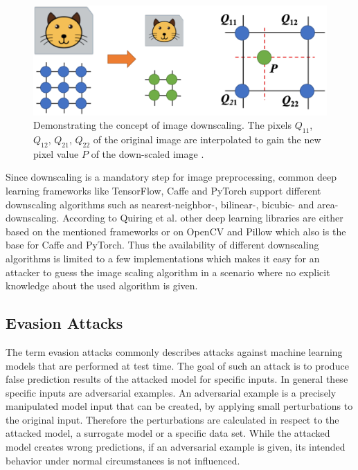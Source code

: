 \documentclass[sigconf]{acmart}
\begin{document}
\begin{figure}[h]
  \centering
  \includegraphics[width=\linewidth]{img/img_scaling.png}
  \caption{Demonstrating the concept of image downscaling. The pixels $Q_{11}$, $Q_{12}$, $Q_{21}$, $Q_{22}$ of the original image are interpolated to gain the new pixel value $P$ of the down-scaled image \cite{camouflage}.}
  \Description{}
  \label{fig:scaling}
\end{figure}

Since downscaling is a mandatory step for image preprocessing, common deep learning frameworks like TensorFlow, Caffe and PyTorch support different downscaling algorithms such as nearest-neighbor-, bilinear-, bicubic- and area-downscaling.
According to Quiring et al.\cite{imgscale} other deep learning libraries are either based on the mentioned frameworks or on OpenCV and Pillow which also is the base for Caffe and PyTorch.
Thus the availability of different downscaling algorithms is limited to a few implementations which makes it easy for an attacker to guess the image scaling algorithm in a scenario where no explicit knowledge about the used algorithm is given.

\subsection{Evasion Attacks}
The term evasion attacks commonly describes attacks against machine learning models that are performed at test time.
The goal of such an attack is to produce false prediction results of the attacked model for specific inputs.
In general these specific inputs are adversarial examples.
An adversarial example is a precisely manipulated model input that can be created, by applying small perturbations to the original input.
Therefore the perturbations are calculated in respect to the attacked model, a surrogate model or a specific data set.
While the attacked model creates wrong predictions, if an adversarial example is given, its intended behavior under normal circumstances is not influenced.
\end{document}
